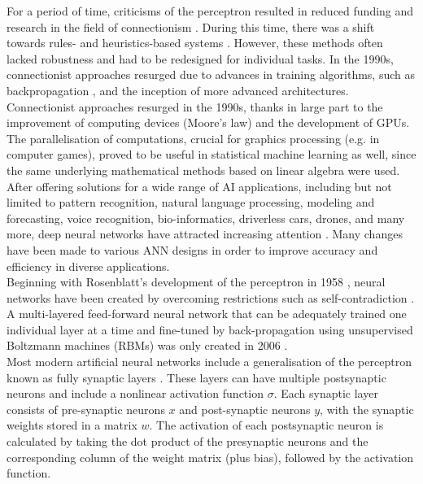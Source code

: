 \noindent For a period of time, criticisms of the perceptron resulted in reduced funding and research in the field of connectionism \cite{marvin1969perceptrons}. During this time, there was a shift towards rules- and heuristics-based systems \cite{lenat1983eurisko}. However, these methods often lacked robustness and had to be redesigned for individual tasks. In the 1990s, connectionist approaches resurged due to advances in training algorithms, such as backpropagation \cite{rumelhart1986learning}, and the inception of more advanced architectures. \\

\noindent Connectionist approaches resurged in the 1990s, thanks in large part to the improvement of computing devices (Moore's law) and the development of GPUs. The parallelisation of computations, crucial for graphics processing (e.g. in computer games), proved to be useful in statistical machine learning as well, since the same underlying mathematical methods based on linear algebra were used. \\

\noindent After offering solutions for a wide range of AI applications, including but not limited to pattern recognition, natural language processing, modeling and forecasting, voice recognition, bio-informatics, driverless cars, drones, and many more, deep neural networks have attracted increasing attention \cite{hemanth2014performance}. Many changes have been made to various ANN designs in order to improve accuracy and efficiency in diverse applications. \\

\noindent Beginning with Rosenblatt's development of the perceptron in 1958 \cite{hornik1989multilayer}, neural networks have been created by overcoming restrictions such as self-contradiction \cite{hinton2006fast}. A multi-layered feed-forward neural network that can be adequately trained one individual layer at a time and fine-tuned by back-propagation using unsupervised Boltzmann machines (RBMs) was only created in 2006 \cite{sun2014application}. \\ 

\noindent Most modern artificial neural networks include a generalisation of the perceptron known as fully synaptic layers \cite{stone2019artificial}. These layers can have multiple postsynaptic neurons and include a nonlinear activation function $\sigma$. Each synaptic layer consists of pre-synaptic neurons $x$ and post-synaptic neurons $y$, with the synaptic weights stored in a matrix $w$. The activation of each postsynaptic neuron is calculated by taking the dot product of the presynaptic neurons and the corresponding column of the weight matrix (plus bias), followed by the activation function. \\

